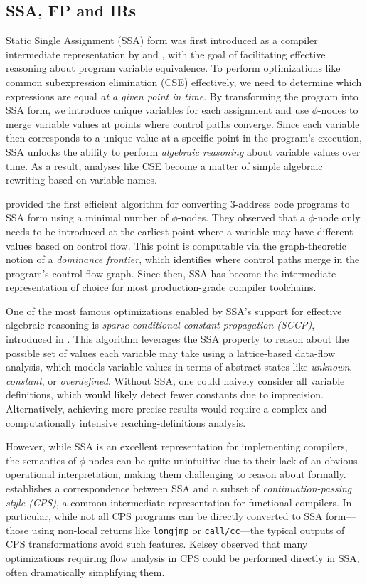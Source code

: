 \documentclass[acmsmall,screen,review]{acmart}
\begin{document}
\subsection{SSA, FP and IRs}

Static Single Assignment (SSA) form was first introduced as a compiler intermediate representation
by \citet{alpern-ssa-original-88} and \citet{rosen-gvn-1988}, with the goal of facilitating
effective reasoning about program variable equivalence. To perform optimizations like common
subexpression elimination (CSE) effectively, we need to determine which expressions are equal
\emph{at a given point in time}. By transforming the program into SSA form, we introduce unique
variables for each assignment and use $\phi$-nodes to merge variable values at points where control
paths converge. Since each variable then corresponds to a unique value at a specific point in the
program's execution, SSA unlocks the ability to perform \emph{algebraic reasoning} about variable
values over time. As a result, analyses like CSE become a matter of simple algebraic rewriting based
on variable names.

\citet{cytron-ssa-intro-91} provided the first efficient algorithm for converting 3-address code
programs to SSA form using a minimal number of $\phi$-nodes. They observed that a $\phi$-node only
needs to be introduced at the earliest point where a variable may have different values based on
control flow. This point is computable via the graph-theoretic notion of a \emph{dominance
frontier}, which identifies where control paths merge in the program's control flow graph. Since
then, SSA has become the intermediate representation of choice for most production-grade
compiler toolchains.

One of the most famous optimizations enabled by SSA's support for effective algebraic reasoning is
\emph{sparse conditional constant propagation (SCCP)}, introduced in \citet{wegman-sccp-91}. This
algorithm leverages the SSA property to reason about the possible set of values each variable may
take using a lattice-based data-flow analysis, which models variable values in terms of abstract
states like \emph{unknown}, \emph{constant}, or \emph{overdefined}. Without SSA, one could naively
consider all variable definitions, which would likely detect fewer constants due to imprecision.
Alternatively, achieving more precise results would require a complex and computationally intensive
reaching-definitions analysis.

However, while SSA is an excellent representation for implementing compilers, the semantics of
$\phi$-nodes can be quite unintuitive due to their lack of an obvious operational interpretation,
making them challenging to reason about formally. \citet{kelsey-95-cps} establishes a correspondence
between SSA and a subset of \emph{continuation-passing style (CPS)}, a common intermediate
representation for functional compilers. In particular, while not all CPS programs can be directly
converted to SSA form—those using non-local returns like \texttt{longjmp} or \texttt{call/cc}—the
typical outputs of CPS transformations avoid such features. Kelsey observed that many optimizations
requiring flow analysis in CPS could be performed directly in SSA, often dramatically simplifying
them.
\end{document}
